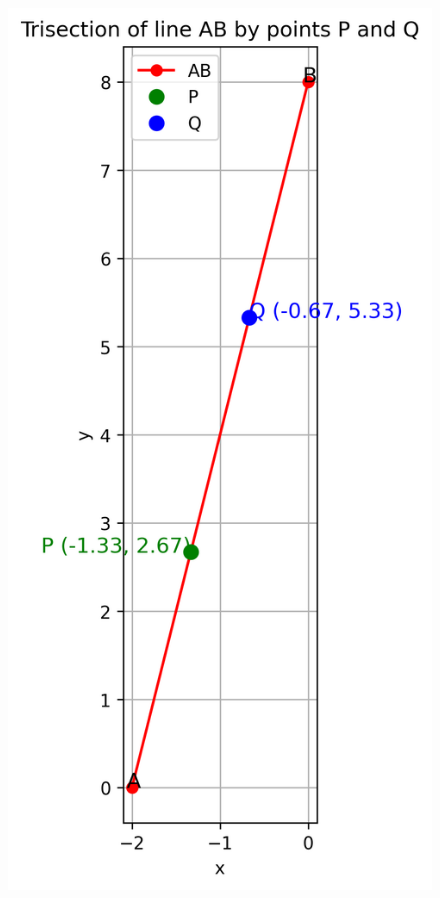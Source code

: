\documentclass[journal]{IEEEtran}
\begin{document}
\begin{figure}[h!]
    \centering
    \includegraphics[height=0.5\textheight, keepaspectratio]{figs/Figure_1.png}
    \label{figure_1}
\end{figure}
 
\end{document}
